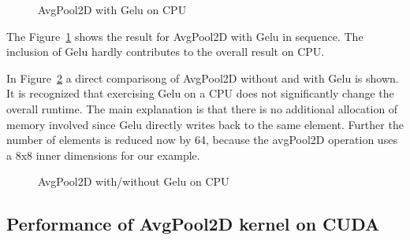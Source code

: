 \documentclass[letterpaper]{article}
\begin{document}
\begin{figure}
\caption{AvgPool2D with Gelu on CPU}
\label{cpuAvgPoolGelu}
\end{figure}

The Figure~\ref{cpuAvgPoolGelu} shows the result for AvgPool2D with Gelu in sequence. The inclusion of Gelu hardly contributes to the overall result on CPU. 

In Figure~\ref{cpuWithWithout} a direct comparisong of AvgPool2D without and with Gelu is shown. It is recognized that exercising Gelu on a CPU does not significantly change the overall runtime. The main explanation is that there is no additional allocation of memory involved since Gelu directly writes back to the same element. Further the number of elements is reduced now by 64, because the avgPool2D operation uses a 8x8 inner dimensions for our example.

\begin{figure}
\caption{AvgPool2D with/without Gelu on CPU}
\label{cpuWithWithout}
\end{figure}

\subsection{Performance of AvgPool2D kernel on CUDA} 
\end{document}
